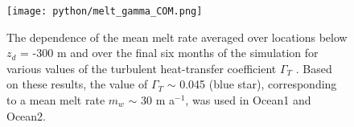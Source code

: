 \documentclass[11pt]{article} %
\begin{document}
\begin{figure}[htbp]
\begin{center}
\texttt{[image: python/melt\_gamma\_COM.png]}
\label{fig1}
\caption{The dependence of the mean melt rate averaged over locations below $z_d$ = -300 m and over the final six months of the simulation for various values of the turbulent heat-transfer coefficient $\Gamma_T$ . Based on these results, the value of $\Gamma_T$ $\sim$ 0.045 (blue star), corresponding to a mean melt rate $m_w$ $\sim$ 30 m a$^{-1}$, was used in Ocean1 and Ocean2.}
\end{center}
\end{figure}






\end{document}
